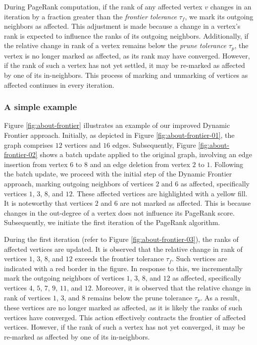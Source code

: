 During PageRank computation, if the rank of any affected vertex $v$ changes in an iteration by a fraction greater than the \textit{frontier tolerance} $\tau_f$, we mark its outgoing neighbors as affected. This adjustment is made because a change in a vertex's rank is expected to influence the ranks of its outgoing neighbors. Additionally, if the relative change in rank of a vertex remains below the \textit{prune tolerance} $\tau_p$, the vertex is no longer marked as affected, as its rank may have converged. However, if the rank of such a vertex has not yet settled, it may be re-marked as affected by one of its in-neighbors. This process of marking and unmarking of vertices as affected continues in every iteration.


\subsubsection{A simple example}

Figure \ref{fig:about-frontier} illustrates an example of our improved Dynamic Frontier approach. Initially, as depicted in Figure \ref{fig:about-frontier-01}, the graph comprises $12$ vertices and $16$ edges. Subsequently, Figure \ref{fig:about-frontier-02} shows a batch update applied to the original graph, involving an edge insertion from vertex $6$ to $8$ and an edge deletion from vertex $2$ to $1$. Following the batch update, we proceed with the initial step of the Dynamic Frontier approach, marking outgoing neighbors of vertices $2$ and $6$ as affected, specifically vertices $1$, $3$, $8$, and $12$. These affected vertices are highlighted with a yellow fill. It is noteworthy that vertices $2$ and $6$ are not marked as affected. This is because changes in the out-degree of a vertex does not influence its PageRank score. Subsequently, we initiate the first iteration of the PageRank algorithm.

During the first iteration (refer to Figure \ref{fig:about-frontier-03}), the ranks of affected vertices are updated. It is observed that the relative change in rank of vertices $1$, $3$, $8$, and $12$ exceeds the frontier tolerance $\tau_f$. Such vertices are indicated with a red border in the figure. In response to this, we incrementally mark the outgoing neighbors of vertices $1$, $3$, $8$, and $12$ as affected, specifically vertices $4$, $5$, $7$, $9$, $11$, and $12$. Moreover, it is observed that the relative change in rank of vertices $1$, $3$, and $8$ remains below the prune tolerance $\tau_p$. As a result, these vertices are no longer marked as affected, as it is likely the ranks of such vertices have converged. This action effectively contracts the frontier of affected vertices. However, if the rank of such a vertex has not yet converged, it may be re-marked as affected by one of its in-neighbors.

